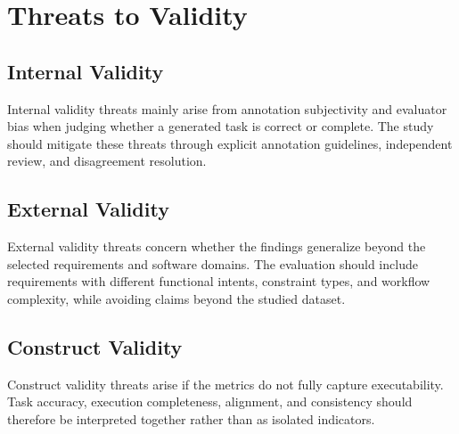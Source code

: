 \section{Threats to Validity}
\label{threats}

\subsection{Internal Validity}
\label{sec:threats-internal}

Internal validity threats mainly arise from annotation subjectivity and evaluator bias when judging whether a generated task is correct or complete.
The study should mitigate these threats through explicit annotation guidelines, independent review, and disagreement resolution.

\subsection{External Validity}
\label{sec:threats-external}

External validity threats concern whether the findings generalize beyond the selected requirements and software domains.
The evaluation should include requirements with different functional intents, constraint types, and workflow complexity, while avoiding claims beyond the studied dataset.

\subsection{Construct Validity}
\label{sec:threats-construct}

Construct validity threats arise if the metrics do not fully capture executability.
Task accuracy, execution completeness, alignment, and consistency should therefore be interpreted together rather than as isolated indicators.
